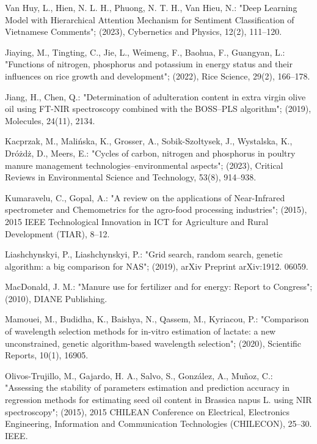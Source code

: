 \documentclass[10pt, a4paper, oneside]{article}
\begin{document}
\begin{thebibliography}{}
{ Van Huy, L., Hien, N. L. H., Phuong, N. T. H., Van Hieu, N.: "Deep Learning Model with Hierarchical Attention Mechanism for Sentiment Classification of Vietnamese Comments"; (2023), Cybernetics and Physics, 12(2), 111–120.

 Jiaying, M., Tingting, C., Jie, L., Weimeng, F., Baohua, F., Guangyan, L.: "Functions of nitrogen, phosphorus and potassium in energy status and their influences on rice growth and development"; (2022), Rice Science, 29(2), 166–178.

 Jiang, H., Chen, Q.: "Determination of adulteration content in extra virgin olive oil using FT-NIR spectroscopy combined with the BOSS--PLS algorithm"; (2019), Molecules, 24(11), 2134.

Kacprzak, M., Malińska, K., Grosser, A., Sobik-Szołtysek, J., Wystalska, K., Dróżdż, D., Meers, E.: "Cycles of carbon, nitrogen and phosphorus in poultry manure management technologies--environmental aspects"; (2023), Critical Reviews in Environmental Science and Technology, 53(8), 914–938.

Kumaravelu, C., Gopal, A.: "A review on the applications of Near-Infrared spectrometer and Chemometrics for the agro-food processing industries"; (2015), 2015 IEEE Technological Innovation in ICT for Agriculture and Rural Development (TIAR), 8–12.

Liashchynskyi, P., Liashchynskyi, P.: "Grid search, random search, genetic algorithm: a big comparison for NAS"; (2019), arXiv Preprint arXiv:1912. 06059.

 MacDonald, J. M.: "Manure use for fertilizer and for energy: Report to Congress"; (2010), DIANE Publishing.

Mamouei, M., Budidha, K., Baishya, N., Qassem, M., Kyriacou, P.: "Comparison of wavelength selection methods for in-vitro estimation of lactate: a new unconstrained, genetic algorithm-based wavelength selection"; (2020), Scientific Reports, 10(1), 16905.

Olivos-Trujillo, M., Gajardo, H. A., Salvo, S., González, A., Muñoz, C.: "Assessing the stability of parameters estimation and prediction accuracy in regression methods for estimating seed oil content in Brassica napus L. using NIR spectroscopy"; (2015), 2015 CHILEAN Conference on Electrical, Electronics Engineering, Information and Communication Technologies (CHILECON), 25–30. IEEE.

}
\end{thebibliography}
\end{document}
